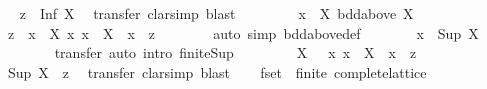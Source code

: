\begin{isabellebody}
\ \isamarkupfalse%
\ {\isachardoublequoteopen}z\ {\isacharbar}{\isasymsubseteq}{\isacharbar}\ Inf\ X{\isachardoublequoteclose}\ \isamarkupfalse%
\ transfer\ {\isacharparenleft}clarsimp{\isacharcomma}\ blast{\isacharparenright}\isanewline
\ \ \isamarkupfalse%
\isanewline
\ \ \ \ \isamarkupfalse%
\ {\isachardoublequoteopen}x\ {\isasymin}\ X{\isachardoublequoteclose}\ {\isachardoublequoteopen}bdd{\isacharunderscore}above\ X{\isachardoublequoteclose}\isanewline
\ \ \ \ \isamarkupfalse%
\ \isamarkupfalse%
\ z\ \ {\isachardoublequoteopen}x\ {\isasymin}\ X{\isachardoublequoteclose}\ {\isachardoublequoteopen}{\isacharparenleft}{\isasymAnd}x{\isachardot}\ x\ {\isasymin}\ X\ {\isasymLongrightarrow}\ x\ {\isacharbar}{\isasymsubseteq}{\isacharbar}\ z{\isacharparenright}{\isachardoublequoteclose}\isanewline
\ \ \ \ \ \ \isamarkupfalse%
\ {\isacharparenleft}auto\ simp{\isacharcolon}\ bdd{\isacharunderscore}above{\isacharunderscore}def{\isacharparenright}\isanewline
\ \ \ \ \isamarkupfalse%
\ \isamarkupfalse%
\ {\isachardoublequoteopen}x\ {\isacharbar}{\isasymsubseteq}{\isacharbar}\ Sup\ X{\isachardoublequoteclose}\isanewline
\ \ \ \ \ \ \isamarkupfalse%
\ transfer\ {\isacharparenleft}auto\ intro{\isacharbang}{\isacharcolon}\ finite{\isacharunderscore}Sup{\isacharparenright}\isanewline
\ \ \isamarkupfalse%
\isanewline
\ \ \ \ \isamarkupfalse%
\ {\isachardoublequoteopen}X\ {\isasymnoteq}\ {\isacharbraceleft}{\isacharbraceright}{\isachardoublequoteclose}\ {\isachardoublequoteopen}{\isacharparenleft}{\isasymAnd}x{\isachardot}\ x\ {\isasymin}\ X\ {\isasymLongrightarrow}\ x\ {\isacharbar}{\isasymsubseteq}{\isacharbar}\ z{\isacharparenright}{\isachardoublequoteclose}\isanewline
\ \ \ \ \isamarkupfalse%
\ \isamarkupfalse%
\ {\isachardoublequoteopen}Sup\ X\ {\isacharbar}{\isasymsubseteq}{\isacharbar}\ z{\isachardoublequoteclose}\ \isamarkupfalse%
\ transfer\ {\isacharparenleft}clarsimp{\isacharcomma}\ blast{\isacharparenright}\isanewline
\ \ \isacommand{{\isacharbraceright}}\isamarkupfalse%
\isanewline
{}\isamarkupfalse%
%
\endisatagproof
{\isafoldproof}%
%
\isadelimproof
\isanewline
%
\endisadelimproof
{}\isamarkupfalse%
\isanewline
\isanewline
{}\isamarkupfalse%
\ fset\ {\isacharcolon}{\isacharcolon}\ {\isacharparenleft}finite{\isacharparenright}\ complete{\isacharunderscore}lattice\isanewline

\end{isabellebody}
